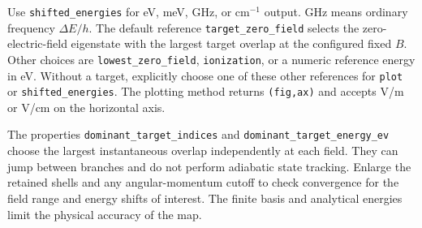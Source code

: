 Use \texttt{shifted\_energies} for eV, meV, GHz, or cm$^{-1}$ output.
GHz means ordinary frequency $\Delta E/h$. The default reference
\texttt{target\_zero\_field} selects the zero-electric-field eigenstate
with the largest target overlap at the configured fixed $B$. Other choices
are \texttt{lowest\_zero\_field}, \texttt{ionization}, or a numeric
reference energy in eV. Without a target, explicitly choose one of these
other references for \texttt{plot} or \texttt{shifted\_energies}.
The plotting method returns \texttt{(fig,ax)} and accepts V/m or V/cm on
the horizontal axis.

The properties \texttt{dominant\_target\_indices} and
\texttt{dominant\_target\_energy\_ev} choose the largest instantaneous
overlap independently at each field. They can jump between branches and
do not perform adiabatic state tracking. Enlarge the retained shells and
any angular-momentum cutoff to check convergence for the field range and
energy shifts of interest. The finite basis and analytical energies limit
the physical accuracy of the map.
\endgroup
